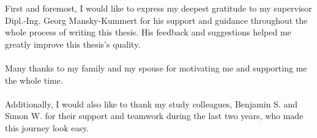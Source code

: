 First and foremost, I would like to express my deepest gratitude to my supervisor Dipl.-Ing. Georg Mansky-Kummert for his support and guidance throughout the whole process of writing this thesis. His feedback and suggestions helped me greatly improve this thesis's quality.\\\\
Many thanks to my family and my spouse for motivating me and supporting me the whole time.\\\\
Additionally, I would also like to thank my study colleagues, Benjamin S. and Simon W. for their support and teamwork during the last two years, who made this journey look easy.